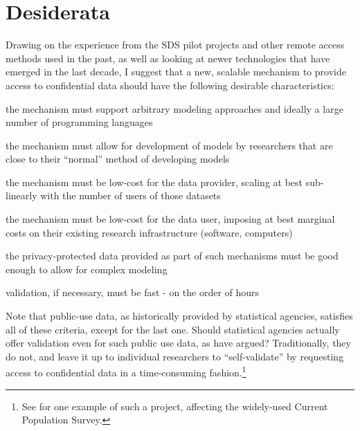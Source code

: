 \documentclass[inline]{hdsr}
\begin{document}
\section{Desiderata}
\label{sec:desiderata}

Drawing on the experience from the SDS pilot projects and other remote access methods used in the past, as well as looking at newer technologies that have emerged in the last decade, I suggest that a new, scalable mechanism to provide access to confidential data should have the following desirable characteristics:

\begin{enumerate}[label={[D\arabic*]}]
    \item the mechanism must support arbitrary modeling approaches and ideally a large number of programming languages
    \item the mechanism must allow for development of models by researchers that are close to their ``normal'' method of developing models
    \item the mechanism must be low-cost for the data provider, scaling at best sub-linearly with the number of users of those datasets
    \item the mechanism must be low-cost for the data user, imposing at best marginal costs on their existing research infrastructure (software, computers)
    \item the privacy-protected data provided as part of such mechanisms must be good enough to allow for complex modeling
    \item validation, if necessary, must be fast - on the order of hours
\end{enumerate}

Note that public-use data, as historically provided by statistical agencies, satisfies all of these criteria, except for the last one. Should statistical agencies actually offer validation even for such public use data, as \citet{reiter_verification_2009} have argued? Traditionally, they do not, and leave it up to individual researchers to ``self-validate'' by requesting access to confidential data in a time-consuming fashion.\footnote{See \citet{armour_using_2016} for one example of such a project, affecting the widely-used Current Population Survey.}
\end{document}
